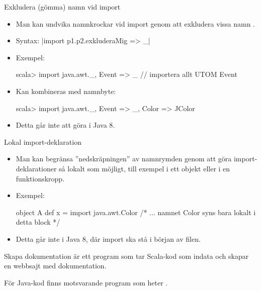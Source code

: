 \begin{Slide}{Exkludera (gömma) namn vid import}
\begin{itemize}
\item Man kan undvika namnkrockar vid import genom att exkludera vissa namn .
\item Syntax:  \code|import p1.p2.{exkluderaMig => _}|
\item Exempel:
\begin{REPL}
scala> import java.awt.{_, Event => _}  // importera allt UTOM Event
\end{REPL}
\item Kan kombineras med namnbyte:
\begin{REPL}
scala> import java.awt.{_, Event => _, Color => JColor}
\end{REPL}
\item Detta går inte att göra i Java 8.
\end{itemize}
\end{Slide}

\begin{Slide}{Lokal import-deklaration}
\begin{itemize}
\item Man kan begränsa ''nedskräpningen'' av namnrymden genom att göra import-deklarationer så lokalt som möjligt, till exempel i ett objekt eller i en funktionskropp.
\item Exempel:
\begin{Code}
object A {
  def x = {
    import java.awt.Color
    /* ... namnet Color syns bara lokalt i detta block */
  }
}
\end{Code}
\item Detta går inte i Java 8, där import ska stå i början av filen.
\end{itemize}
\end{Slide}


\begin{Slide}{Skapa dokumentation}
 är ett program som tar Scala-kod som indata och skapar en webbsajt med dokumentation.

\vspace{2em}

\vspace{2em} För Java-kod finns motsvarande program som heter .
\end{Slide}

